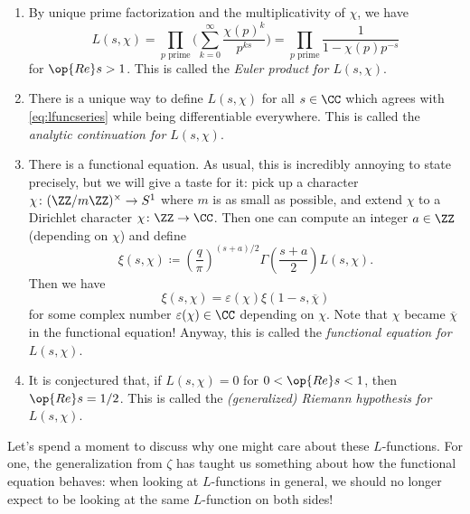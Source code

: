 \documentclass{article}
\begin{document}
\begin{enumerate}
	\item By unique prime factorization and the multiplicativity of $\chi$, we have
	\[L(s,\chi)=\prod_{p\text{ prime}}\Bigg(\sum_{k=0}^\infty\frac{\chi(p)^k}{p^{ks}}\Bigg)=\prod_{p\text{ prime}}\frac1{1-\chi(p)p^{-s}}\]
	for $\op{Re}s>1$. This is called the \textit{Euler product for $L(s,\chi)$}.
	\item There is a unique way to define $L(s,\chi)$ for all $s\in\CC$ which agrees with \autoref{eq:lfuncseries} while being differentiable everywhere. This is called the \textit{analytic continuation for $L(s,\chi)$}.
	\item There is a functional equation. As usual, this is incredibly annoying to state precisely, but we will give a taste for it: pick up a character $\chi\colon(\ZZ/m\ZZ)^\times\to S^1$ where $m$ is as small as possible, and extend $\chi$ to a Dirichlet character $\chi\colon\ZZ\to\CC$. Then one can compute an integer $a\in\ZZ$ (depending on $\chi$) and define
	\[\xi(s,\chi)\coloneqq\left(\frac q\pi\right)^{(s+a)/2}\Gamma\left(\frac{s+a}2\right)L(s,\chi).\]
	Then we have
	\[\xi(s,\chi)=\varepsilon(\chi)\xi(1-s,\overline\chi)\]
	for some complex number $\varepsilon(\chi)\in\CC$ depending on $\chi$. Note that $\chi$ became $\overline\chi$ in the functional equation! Anyway, this is called the \textit{functional equation for $L(s,\chi)$}.
	\item It is conjectured that, if $L(s,\chi)=0$ for $0<\op{Re}s<1$, then $\op{Re}s=1/2$. This is called the \textit{(generalized) Riemann hypothesis for $L(s,\chi)$}.
\end{enumerate}
Let's spend a moment to discuss why one might care about these $L$-functions. For one, the generalization from $\zeta$ has taught us something about how the functional equation behaves: when looking at $L$-functions in general, we should no longer expect to be looking at the same $L$-function on both sides!
\end{document}
